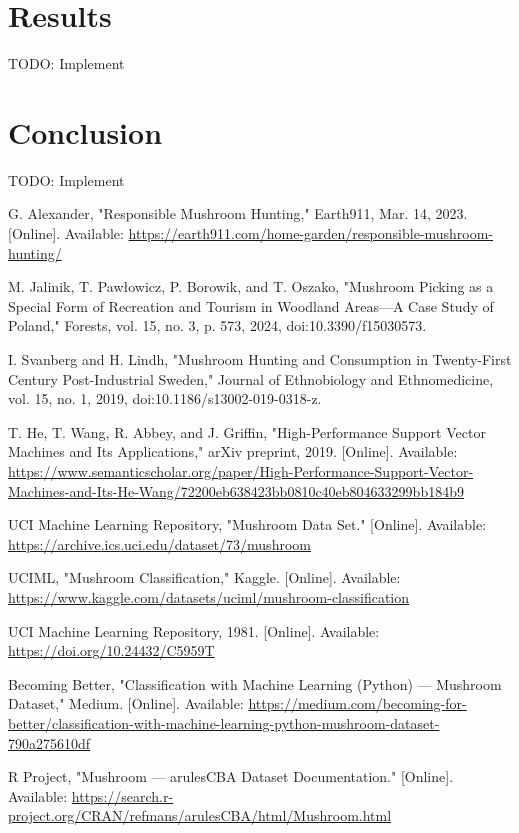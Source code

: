 \documentclass[conference]{IEEEtran}
\begin{document}
\clearpage

\section{Results}
TODO: Implement


\section{Conclusion}
TODO: Implement

\begin{thebibliography}{9}
 G. Alexander, "Responsible Mushroom Hunting," Earth911, Mar. 14, 2023. [Online]. Available: \url{https://earth911.com/home-garden/responsible-mushroom-hunting/}

 M. Jalinik, T. Paw\l{}owicz, P. Borowik, and T. Oszako, "Mushroom Picking as a Special Form of Recreation and Tourism in Woodland Areas—A Case Study of Poland," Forests, vol. 15, no. 3, p. 573, 2024, doi:10.3390/f15030573.

 I. Svanberg and H. Lindh, "Mushroom Hunting and Consumption in Twenty-First Century Post-Industrial Sweden," Journal of Ethnobiology and Ethnomedicine, vol. 15, no. 1, 2019, doi:10.1186/s13002-019-0318-z.

 T. He, T. Wang, R. Abbey, and J. Griffin, "High-Performance Support Vector Machines and Its Applications," arXiv preprint, 2019. [Online]. Available: \url{https://www.semanticscholar.org/paper/High-Performance-Support-Vector-Machines-and-Its-He-Wang/72200eb638423bb0810c40eb804633299bb184b9}

 UCI Machine Learning Repository, "Mushroom Data Set." [Online]. Available: \url{https://archive.ics.uci.edu/dataset/73/mushroom}

 UCIML, "Mushroom Classification," Kaggle. [Online]. Available: \url{https://www.kaggle.com/datasets/uciml/mushroom-classification}

 UCI Machine Learning Repository, 1981. [Online]. Available: \url{https://doi.org/10.24432/C5959T}

 Becoming Better, "Classification with Machine Learning (Python) — Mushroom Dataset," Medium. [Online]. Available: \url{https://medium.com/becoming-for-better/classification-with-machine-learning-python-mushroom-dataset-790a275610df}

 R Project, "Mushroom — arulesCBA Dataset Documentation." [Online]. Available: \url{https://search.r-project.org/CRAN/refmans/arulesCBA/html/Mushroom.html}


\end{thebibliography}
\end{document}
